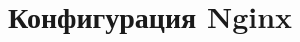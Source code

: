 \chapter{Конфигурация Nginx}
\label{cha:appendix2}

\begin{listing}[H]
\end{listing}
\label{lst:c}


\begin{listing}[H]
\end{listing}
\label{lst:c}

